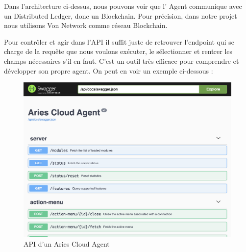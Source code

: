 \documentclass[12pt, openany]{report}
\begin{document}
\vspace{2mm}
Dans l'architecture ci-dessus, nous pouvons voir que l' Agent communique avec un Distributed Ledger, donc un Blockchain. Pour précision, dans notre projet nous utilisons Von Network comme réseau Blockchain.

\vspace{2mm}
Pour contrôler et agir dans l'API il suffit juste de retrouver l'endpoint qui se charge de la requête que nous voulons exécuter, le sélectionner et rentrer les champs nécessaires s'il en faut. C'est un outil très efficace pour comprendre et développer son propre agent. On peut en voir un exemple ci-dessous :\\
\begin{figure}[H]
\includegraphics[scale=0.17]{adminApi.png}
\centering
\caption{API d'un Aries Cloud Agent}
\end{figure}
\end{document}
